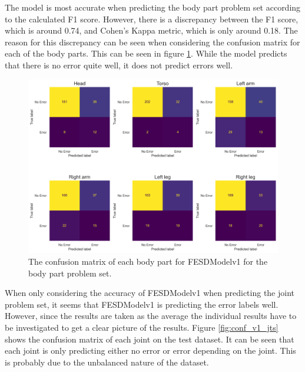 The model is most accurate when predicting the body part problem set according to the calculated F1 score. However, there is a discrepancy between the F1 score, which is around 0.74, and Cohen's Kappa metric, which is only around 0.18. The reason for this discrepancy can be seen when considering the confusion matrix for each of the body parts. This can be seen in figure \ref{fig:conf_v1_bps}. While the model predicts that there is no error quite well, it does not predict errors well.

\begin{figure}[!htbp]
  \centering
  \includegraphics[width=.8\linewidth]{figures/Results/v1/confusion/body_parts_part.png}
  \caption[Confusion matrix of FESDModelv1 for each Body Part]{The confusion matrix of each body part for FESDModelv1 for the body part problem set.}
  \label{fig:conf_v1_bps}
\end{figure}

When only considering the accuracy of FESDModelv1 when predicting the joint problem set, it seems that FESDModelv1 is predicting the error labels well. However, since the results are taken as the average the individual results have to be investigated to get a clear picture of the results. Figure \ref{fig:conf_v1_jts} shows the confusion matrix of each joint on the test dataset. It can be seen that each joint is only predicting either no error or error depending on the joint. This is probably due to the unbalanced nature of the dataset.

